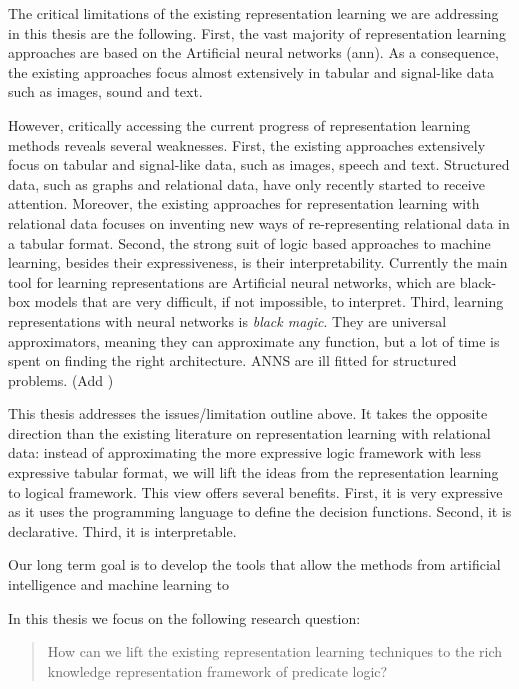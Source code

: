 The critical limitations of the existing representation learning we are addressing in this thesis are the following.
First, the vast majority of representation learning approaches are based on the Artificial neural networks (\gls{ann}).
As a consequence, the existing approaches focus almost extensively in tabular and signal-like data such as images, sound and text.

However, critically accessing the current progress of representation learning methods reveals several weaknesses.
First, the existing approaches extensively focus on tabular and signal-like data, such as images, speech and text.
Structured data, such as graphs and relational data, have only recently started to receive attention.
Moreover, the existing approaches for representation learning with relational data focuses on inventing new ways of re-representing relational data in a tabular format.
Second, the strong suit of logic based approaches to machine learning, besides their expressiveness, is their interpretability.
Currently the main tool for learning representations are Artificial neural networks, which are black-box models that are very difficult, if not impossible, to interpret.
Third, learning representations with neural networks is \textit{black magic}.
They are universal approximators, meaning they can approximate any function, but a lot of time is spent on finding the right architecture.
ANNS are ill fitted for structured problems. (Add )






This thesis addresses the issues/limitation outline above.
It takes the opposite direction than the existing literature on representation learning with relational data: instead of approximating the more expressive logic framework with less expressive tabular format, we will lift the ideas from the representation learning to logical framework.
This view offers several benefits.
First, it is very expressive as it uses the programming language to define the decision functions.
Second, it is declarative.
Third, it is interpretable.



Our long term goal is to develop the tools that allow the methods from artificial intelligence and machine learning to 



In this thesis we focus on the following research question:

\begin{quote}
	How can we lift the existing representation learning techniques to the rich knowledge representation framework of predicate logic?
\end{quote}






